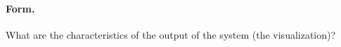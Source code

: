 
\paragraph{Form.} What are the characteristics of the output of the system (the
  visualization)?

